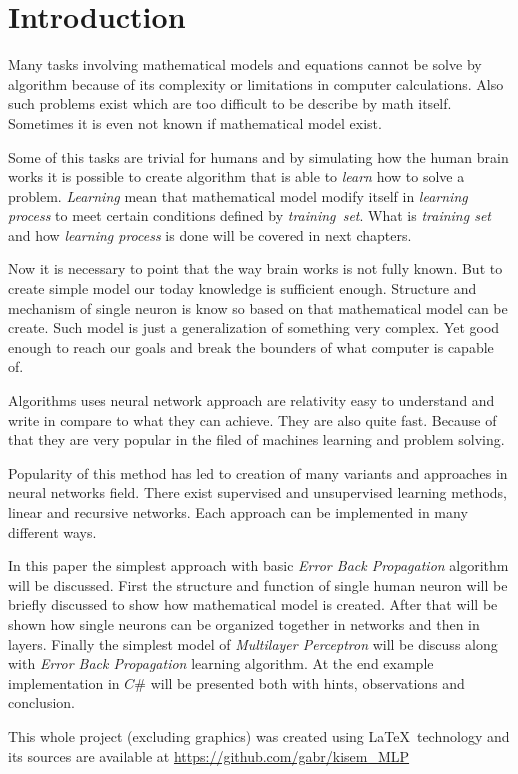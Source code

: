 \section{Introduction}
Many tasks involving mathematical models and equations cannot be solve by algorithm because of its complexity or limitations in computer calculations. Also such problems exist which are too difficult to be describe by math itself. Sometimes it is even not known if mathematical model exist.

Some of this tasks are trivial for humans and by simulating how the human brain works it is possible to create algorithm that is able to \textit{learn} how to solve a problem. \textit{Learning} mean that mathematical model modify itself in \textit{learning process} to meet certain conditions defined by \textit{training~set}. What is \textit{training set} and how \textit{learning process} is done will be covered in next chapters.

Now it is necessary to point that the way brain works is not fully known. But to create simple model our today knowledge is sufficient enough. Structure and mechanism of single neuron is know so based on that mathematical model can be create. Such model is just a generalization of something very complex. Yet good enough to reach our goals and break the bounders of what computer is capable of.

Algorithms uses neural network approach are relativity easy to understand and write in compare to what they can achieve. They are also quite fast. Because of that they are very popular in the filed of machines learning and problem solving.

Popularity of this method has led to creation of many variants and approaches in neural networks field. There exist supervised and unsupervised learning methods, linear and recursive networks. Each approach can be implemented in many different ways.

In this paper the simplest approach with basic \textit{Error Back Propagation} algorithm will be discussed. First the structure and function of single human neuron will be briefly discussed to show how mathematical model is created. After that will be shown how single neurons can be organized together in networks and then in layers. Finally the simplest model of \textit{Multilayer Perceptron} will be discuss along with \textit{Error Back Propagation} learning algorithm. At the end example implementation in $ C\# $ will be presented both with hints, observations and conclusion.

\begin{bottompar}
This whole project (excluding graphics) was created using \LaTeX \ technology and its sources are available at \url{https://github.com/gabr/kisem_MLP}

\ 
\end{bottompar}